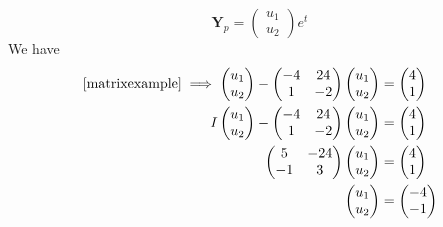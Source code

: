 \documentclass{article}
\begin{document}
\[ \bm Y_p = \begin{pmatrix}
		u_1 \\ u_2
	\end{pmatrix} e^t \]
We have
\begin{align*}
	\eqref{matrixexample} \implies \begin{pmatrix}
		u_1 \\ u_2
	\end{pmatrix} - \begin{pmatrix}
		-4 & 24 \\ 1 & -2
	\end{pmatrix}\begin{pmatrix}
		u_1 \\ u_2
	\end{pmatrix} & = \begin{pmatrix}
		4 \\ 1
	\end{pmatrix} \\
	I\begin{pmatrix}
		u_1 \\ u_2
	\end{pmatrix} - \begin{pmatrix}
		-4 & 24 \\ 1 & -2
	\end{pmatrix}\begin{pmatrix}
		u_1 \\ u_2
	\end{pmatrix}                               & = \begin{pmatrix}
		4 \\ 1
	\end{pmatrix} \\
	\begin{pmatrix}
		5 & -24 \\ -1 & 3
	\end{pmatrix}\begin{pmatrix}
		u_1 \\ u_2
	\end{pmatrix}                                                              & = \begin{pmatrix}
		4 \\ 1
	\end{pmatrix} \\
	\begin{pmatrix}
		u_1 \\ u_2
	\end{pmatrix}                                                                                         & = \begin{pmatrix}
		-4 \\ -1
	\end{pmatrix}
\end{align*}
\end{document}
